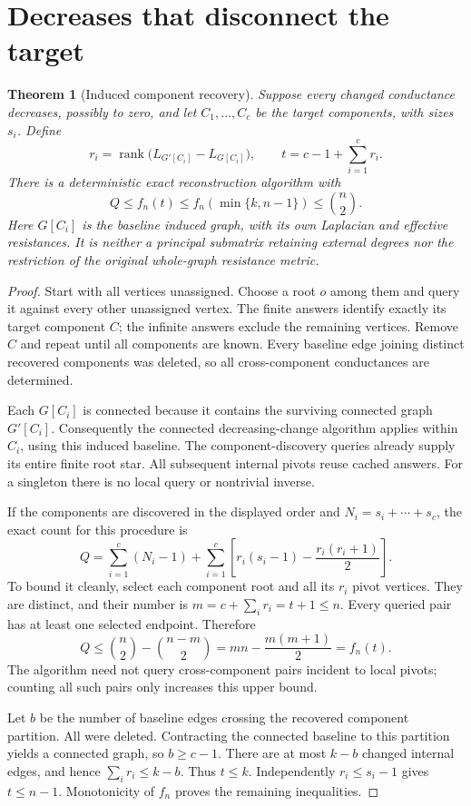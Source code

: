 \documentclass[11pt,letterpaper]{article}
\newtheorem{theorem}{Theorem}
\newcommand{\rank}{\operatorname{rank}}
\begin{document}
\section{Decreases that disconnect the target}
\begin{theorem}[Induced component recovery]\label{thm:disconnected}
Suppose every changed conductance decreases, possibly to zero, and let $C_1,\ldots,C_c$ be the target components, with sizes $s_i$. Define
\[
 r_i=\rank\bigl(L_{G'[C_i]}-L_{G[C_i]}\bigr),\qquad
 t=c-1+\sum_{i=1}^c r_i.
\]
There is a deterministic exact reconstruction algorithm with
\[
 Q\le f_n(t)\le f_n(\min\{k,n-1\})\le\binom n2.
\]
Here $G[C_i]$ is the baseline induced graph, with its own Laplacian and effective resistances. It is neither a principal submatrix retaining external degrees nor the restriction of the original whole-graph resistance metric.
\end{theorem}

\begin{proof}
Start with all vertices unassigned. Choose a root $o$ among them and query it against every other unassigned vertex. The finite answers identify exactly its target component $C$; the infinite answers exclude the remaining vertices. Remove $C$ and repeat until all components are known. Every baseline edge joining distinct recovered components was deleted, so all cross-component conductances are determined.

Each $G[C_i]$ is connected because it contains the surviving connected graph $G'[C_i]$. Consequently the connected decreasing-change algorithm applies within $C_i$, using this induced baseline. The component-discovery queries already supply its entire finite root star. All subsequent internal pivots reuse cached answers. For a singleton there is no local query or nontrivial inverse.

If the components are discovered in the displayed order and $N_i=s_i+\cdots+s_c$, the exact count for this procedure is
\[
 Q=\sum_{i=1}^c(N_i-1)
   +\sum_{i=1}^c\left[r_i(s_i-1)-\frac{r_i(r_i+1)}2\right].
\]
To bound it cleanly, select each component root and all its $r_i$ pivot vertices. They are distinct, and their number is $m=c+\sum_i r_i=t+1\le n$. Every queried pair has at least one selected endpoint. Therefore
\[
 Q\le\binom n2-\binom{n-m}2
   =mn-\frac{m(m+1)}2=f_n(t).
\]
The algorithm need not query cross-component pairs incident to local pivots; counting all such pairs only increases this upper bound.

Let $b$ be the number of baseline edges crossing the recovered component partition. All were deleted. Contracting the connected baseline to this partition yields a connected graph, so $b\ge c-1$. There are at most $k-b$ changed internal edges, and hence $\sum_i r_i\le k-b$. Thus $t\le k$. Independently $r_i\le s_i-1$ gives $t\le n-1$. Monotonicity of $f_n$ proves the remaining inequalities.
\end{proof}
\end{document}
